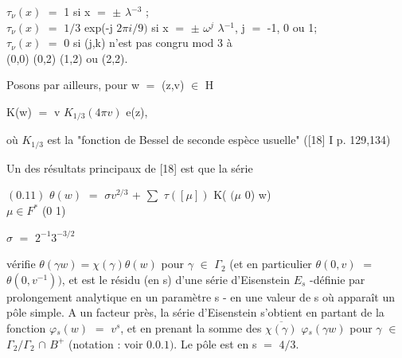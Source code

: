 \documentclass[10pt,a4paper]{article}
\begin{document}
\par\smallskip\begin{center}\begin{minipage}{0.96\textwidth}\centering
$\tau{}_\nu{}(x)$ $=$ 1 si x $=$ $\pm{}$ $\lambda{}^{-3}$ ; \\ $\tau{}_\nu{}(x)$ $=$ $1/3$ exp(-j $2\pi{}i/9)$ si x $=$ $\pm{}$ $\omega{}^j$ $\lambda{}^{-1}$, j $=$ -1, 0 ou 1; \\ $\tau{}_\nu{}(x)$ $=$ 0 si (j,k) n'est pas congru mod 3 à \\ (0,0) (0,2) (1,2) ou (2,2).
\end{minipage}\end{center}\smallskip
\par Posons par ailleurs, pour w $=$ (z,v) $\in{}$ H\par
\par\smallskip\begin{center}\begin{minipage}{0.96\textwidth}\centering
K(w) $=$ v $K_{1/3}(4\pi{}v)$ e(z),
\end{minipage}\end{center}\smallskip
\par où $K_{1/3}$ est la "fonction de Bessel de seconde espèce usuelle" ([18] I p. 129,134)\par
\par Un des résultats principaux de [18] est que la série\par
\par\smallskip\begin{center}\begin{minipage}{0.96\textwidth}\centering
$(0.11)$ $\theta{}(w)$ $=$ $\sigma{}v^{2/3}$ + $\sum{}$ $\tau{}([\mu{}])$ K( $(\mu{}$ 0) w) \\ $\mu{}\in{}F^*$ (0 1)
\end{minipage}\end{center}\smallskip
\par\smallskip\begin{center}\begin{minipage}{0.96\textwidth}\centering
$\sigma{}$ $=$ $2^{-1}3^{-3/2}$
\end{minipage}\end{center}\smallskip
\par vérifie $\theta{}(\gamma{}w)=\chi{}(\gamma{})\theta{}(w)$ pour $\gamma{}$ $\in{}$ $\Gamma{}_2$ (et en particulier $\theta{}(0,v)$ $=$ $\theta{}(0,v^{-1}))$, et est le résidu (en s) d'une série d'Eisenstein $E_s$ -définie par prolongement analytique en un paramètre s - en une valeur de s où apparaît un pôle simple. A un facteur près, la série d'Eisenstein s'obtient en partant de la fonction $\varphi{}_s(w)$ $=$ $v^s$, et en prenant la somme des $\overline{\chi{}(\gamma{})}$ $\varphi{}_s(\gamma{}w)$ pour $\gamma{}$ $\in{}$ $\Gamma{}_2/\Gamma{}_2$ $\cap{}$ $B^+$ (notation : voir $0.0.1)$. Le pôle est en s $=$ $4/3$.\par
\end{document}
